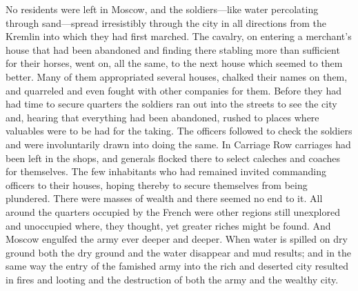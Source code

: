 No residents were left in Moscow, and the soldiers---like water
percolating through sand---spread irresistibly through the city
in all directions from the Kremlin into which they had first
marched. The cavalry, on entering a merchant's house that had
been abandoned and finding there stabling more than sufficient
for their horses, went on, all the same, to the next house which
seemed to them better. Many of them appropriated several houses,
chalked their names on them, and quarreled and even fought with
other companies for them. Before they had had time to secure
quarters the soldiers ran out into the streets to see the city
and, hearing that everything had been abandoned, rushed to places
where valuables were to be had for the taking. The officers
followed to check the soldiers and were involuntarily drawn into
doing the same. In Carriage Row carriages had been left in the
shops, and generals flocked there to select caleches and coaches
for themselves.  The few inhabitants who had remained invited
commanding officers to their houses, hoping thereby to secure
themselves from being plundered.  There were masses of wealth and
there seemed no end to it. All around the quarters occupied by
the French were other regions still unexplored and unoccupied
where, they thought, yet greater riches might be found.  And
Moscow engulfed the army ever deeper and deeper. When water is
spilled on dry ground both the dry ground and the water disappear
and mud results; and in the same way the entry of the famished
army into the rich and deserted city resulted in fires and
looting and the destruction of both the army and the wealthy
city.

